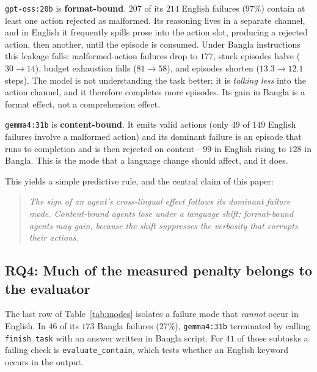 \documentclass[11pt]{article}
\begin{document}
\texttt{gpt-oss:20b} is \textbf{format-bound}. $207$ of its $214$ English failures ($97\%$)
contain at least one action rejected as malformed. Its reasoning lives in a separate channel,
and in English it frequently spills prose into the action slot, producing a rejected action,
then another, until the episode is consumed. Under Bangla instructions this leakage falls:
malformed-action failures drop to $177$, stuck episodes halve ($30\rightarrow14$), budget
exhaustion falls ($81\rightarrow58$), and episodes shorten ($13.3\rightarrow12.1$ steps). The
model is not understanding the task better; it is \emph{talking less} into the action channel,
and it therefore completes more episodes. Its gain in Bangla is a format effect, not a
comprehension effect.

\texttt{gemma4:31b} is \textbf{content-bound}. It emits valid actions (only $49$ of $149$
English failures involve a malformed action) and its dominant failure is an episode that runs to
completion and is then rejected on content---$99$ in English rising to $128$ in Bangla. This is
the mode that a language change should affect, and it does.

This yields a simple predictive rule, and the central claim of this paper:

\begin{quote}\itshape
The sign of an agent's cross-lingual effect follows its dominant failure mode. Content-bound
agents lose under a language shift; format-bound agents may gain, because the shift suppresses
the verbosity that corrupts their actions.
\end{quote}

\subsection{RQ4: Much of the measured penalty belongs to the evaluator}

The last row of Table~\ref{tab:modes} isolates a failure mode that \emph{cannot} occur in
English. In $46$ of its $173$ Bangla failures ($27\%$), \texttt{gemma4:31b} terminated by
calling \texttt{finish\_task} with an answer written in Bangla script. For $41$ of those
subtasks a failing check is \texttt{evaluate\_contain}, which tests whether an English keyword
occurs in the output.
\end{document}
